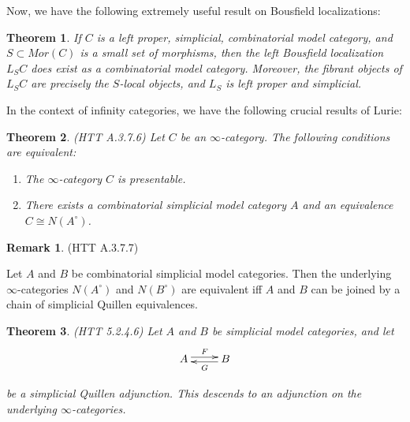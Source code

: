 \documentclass[letterpaper]{article}
\newtheorem{theorem}{Theorem}
\theoremstyle{definition}
\newtheorem{remark}[lemma]{Remark}
\begin{document}
Now, we have the following extremely useful result on Bousfield
localizations:


\begin{theorem}
If $C$ is a left proper, simplicial, combinatorial model category, and
$S \subset Mor(C)$ is a small set of morphisms, then the left
Bousfield localization $L_SC$ does exist as a combinatorial model
category. Moreover, the fibrant objects of $L_SC$ are precisely the
$S$-local objects, and $L_S$ is left proper and simplicial.
\end{theorem}

In the context of infinity categories, we have the following crucial
results of Lurie:

\begin{theorem}(HTT A.3.7.6)
Let $C$ be an $\infty$-category. The following conditions are
equivalent:

\begin{enumerate}
\item The $\infty$-category $C$ is presentable.
\item There exists a combinatorial simplicial model category $A$ and
  an equivalence $C \cong N(A^\circ)$.
\end{enumerate}
\end{theorem}

\begin{remark}(HTT A.3.7.7)

Let $A$ and $B$ be combinatorial simplicial model categories. Then the
underlying $\infty$-categories $N(A^\circ)$ and $N(B^\circ)$ are
equivalent iff $A$ and $B$ can be joined by a chain of simplicial
Quillen equivalences. 
\end{remark}

\begin{theorem}(HTT 5.2.4.6)
Let $A$ and $B$ be simplicial model categories, and let 
\[
\xymatrix{A \ar@<.5ex>[r]^F & \ar@<.5ex>[l]^G B}
\]

be a simplicial Quillen adjunction. This descends to an adjunction on
the underlying $\infty$-categories.
\end{theorem}
\end{document}
